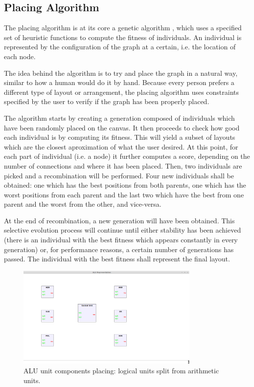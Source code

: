 \label{chap:impl}

\subsection{Placing Algorithm}
 
The placing algorithm is at its core a genetic algorithm \cite{chambers2010practical}, which uses
a specified set of heuristic functions to compute the fitness of individuals.
An individual is represented by the configuration of the graph at a certain, i.e.
the location of each node.

The idea behind the algorithm is to try and place the graph in a natural way, similar
to how a human would do it by hand. Because every person prefers a different type of 
layout or arrangement, the placing algorithm uses constraints specified by the user
to verify if the graph has been properly placed.

The algorithm starts by creating a generation composed of individuals which have 
been randomly placed on the canvas. It then proceeds to check how good each 
individual is by computing its fitness. This will yield a subset of layouts which
are the closest aproximation of what the user desired. At this point, for each 
part of individual (i.e. a node) it further computes a score, depending on the
number of connections and where it has been placed. Then, two individuals are 
picked and a recombination will be performed. Four new individuals shall be obtained:
one which has the best positions from both parents, one which has the worst positions
from each parent and the last two which have the best from one parent and the 
worst from the other, and vice-versa.

At the end of recombination, a new generation will have been obtained. This selective 
evolution process \cite{goldberg2006genetic} will continue until either stability has been achieved (there is an
individual with the best fitness which appears constantly in every generation) or, for 
performance reasons, a certain number of generations has passed. The individual with 
the best fitness shall represent the final layout.

\begin{figure}[ht] \centering
\includegraphics[width=0.8\textwidth]{src/placingLogic.png}
\caption{ALU unit components placing: logical units split from arithmetic units.} \end{figure}

